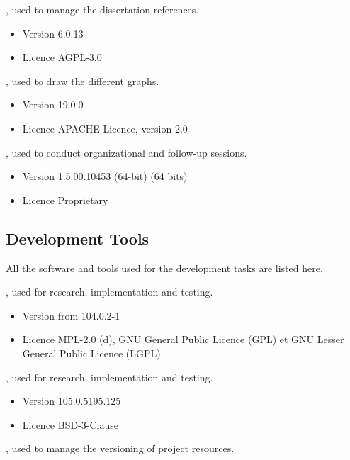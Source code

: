 , used to manage the dissertation references.

\begin{itemize}
	\item Version 6.0.13
	\item Licence AGPL-3.0
\end{itemize}


, used to draw the different graphs.

\begin{itemize}
	\item Version 19.0.0
	\item Licence APACHE Licence, version 2.0
\end{itemize}


, used to conduct organizational and follow-up sessions.

\begin{itemize}
	\item Version 1.5.00.10453 (64-bit) (64 bits)
	\item Licence Proprietary
\end{itemize}

\newpage

\subsection*{Development Tools}

All the software and tools used for the development tasks are listed here.

, used for research, implementation and testing.

\begin{itemize}
	\item Version from 104.0.2-1
	\item Licence MPL-2.0 (d), GNU General Public Licence (GPL) et GNU Lesser General Public Licence (LGPL)
\end{itemize}


, used for research, implementation and testing.

\begin{itemize}
	\item Version 105.0.5195.125
	\item Licence BSD-3-Clause
\end{itemize}


, used to manage the versioning of project resources.

